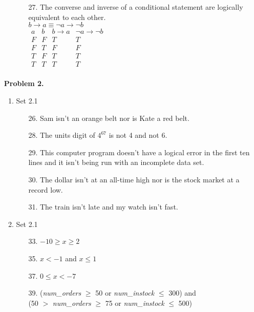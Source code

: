 \documentclass[letterpaper]{article}
\begin{document}
\begin{enumerate}
\begin{enumerate}
\begin{itemize}
				\item [27.]
				The converse and inverse of a conditional statement are logically equivalent to each other. \\
				$b \rightarrow a \equiv \neg a \rightarrow \neg b$ \\
				$\begin{array}{c|c|c|c}
					a & b & b \rightarrow a & \neg a \rightarrow \neg b \\ \hline
					F & F & T & T \\ \hline
					F & T & F & F \\ \hline
					T & F & T & T \\ \hline
					T & T & T & T \\
				\end{array}$
			\end{itemize}
		\end{enumerate}
	
		\item [] \textbf{Problem 2.}
		\begin{enumerate}
			\item Set 2.1
			\begin{itemize}
				\item [26.] Sam isn't an orange belt nor is Kate a red belt.
				\item [28.] The units digit of $4^{67}$ is not 4 and not 6.
				\item [29.] This computer program doesn't have a logical error in the first ten lines and it isn't being run with an incomplete data set.
				\item [30.] The dollar isn't at an all-time high nor is the stock market at a record low.
				\item [31.] The train isn't late and my watch isn't fast.
			\end{itemize}
			
			\item Set 2.1
			\begin{itemize}
				\item [33.] $-10 \geq x \geq 2$
				\item [35.] $x < -1$ and $x \leq 1$
				\item [37.] $0 \leq x < -7$
				\item [39.] 
				(\textit{num\_orders} $\geq$ 50 or \textit{num\_instock} $\leq$ 300) and \\
				(50 $>$ \textit{num\_orders} $\geq$ 75 or \textit{num\_instock} $\leq$ 500) \\
				

\end{itemize}
\end{enumerate}
\end{enumerate}
\end{document}

